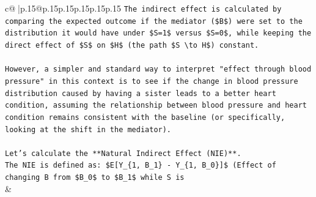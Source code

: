 \documentclass{article}
\begin{document}
{\begin{supertabular}{c@{$\;$}|p{.15\linewidth}@{}p{.15\linewidth}p{.15\linewidth}p{.15\linewidth}p{.15\linewidth}p{.15\linewidth}}
{{{\texttt{The indirect effect is calculated by comparing the expected outcome if the mediator (\$B\$) were set to the distribution it would have under \$S=1\$ versus \$S=0\$, while keeping the direct effect of \$S\$ on \$H\$ (the path \$S \textbackslash{}to H\$) constant.} \\
\\ 
\texttt{However, a simpler and standard way to interpret "effect through blood pressure" in this context is to see if the change in blood pressure distribution caused by having a sister leads to a better heart condition, assuming the relationship between blood pressure and heart condition remains consistent with the baseline (or specifically, looking at the shift in the mediator).} \\
\\ 
\texttt{Let's calculate the **Natural Indirect Effect (NIE)**.} \\
\texttt{The NIE is defined as: \$E{[}Y\_\{1, B\_1\} {-} Y\_\{1, B\_0\}{]}\$ (Effect of changing B from \$B\_0\$ to \$B\_1\$ while S is} \\
            }
        }
    }
    & \\ \\


\end{supertabular}}
\end{document}

